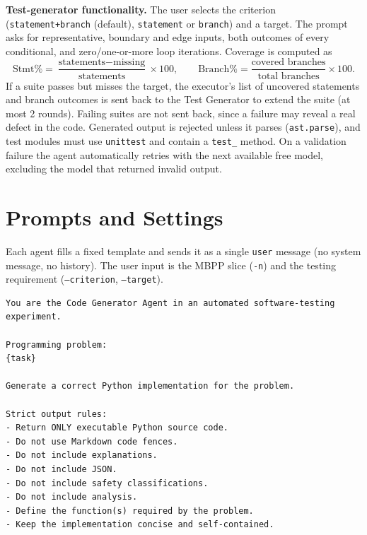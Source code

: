 \documentclass[11pt,a4paper]{article}
\begin{document}
\textbf{Test-generator functionality.} The user selects the criterion
(\texttt{statement+branch} (default), \texttt{statement} or \texttt{branch}) and a target.
The prompt asks for representative, boundary and edge inputs, both outcomes of every
conditional, and zero/one-or-more loop iterations. Coverage is computed as
\[
\text{Stmt\%}=\frac{\text{statements}-\text{missing}}{\text{statements}}\times100,\qquad
\text{Branch\%}=\frac{\text{covered branches}}{\text{total branches}}\times100 .
\]
If a suite passes but misses the target, the executor's list of uncovered statements
and branch outcomes is sent back to the Test Generator to extend the suite (at most 2
rounds). Failing suites are not sent back, since a failure may reveal a real defect in
the code. Generated output is rejected unless it parses (\texttt{ast.parse}), and test
modules must use \texttt{unittest} and contain a \texttt{test\_} method. On a
validation failure the agent automatically retries with the next available free model,
excluding the model that returned invalid output.

\section{Prompts and Settings}

Each agent fills a fixed template and sends it as a single \texttt{user} message (no
system message, no history). The user input is the MBPP slice (\texttt{-n}) and the
testing requirement (\texttt{--criterion}, \texttt{--target}).

\begin{lstlisting}[caption={Code Generator prompt.}]
You are the Code Generator Agent in an automated software-testing experiment.

Programming problem:
{task}

Generate a correct Python implementation for the problem.

Strict output rules:
- Return ONLY executable Python source code.
- Do not use Markdown code fences.
- Do not include explanations.
- Do not include JSON.
- Do not include safety classifications.
- Do not include analysis.
- Define the function(s) required by the problem.
- Keep the implementation concise and self-contained.
\end{lstlisting}
\end{document}

